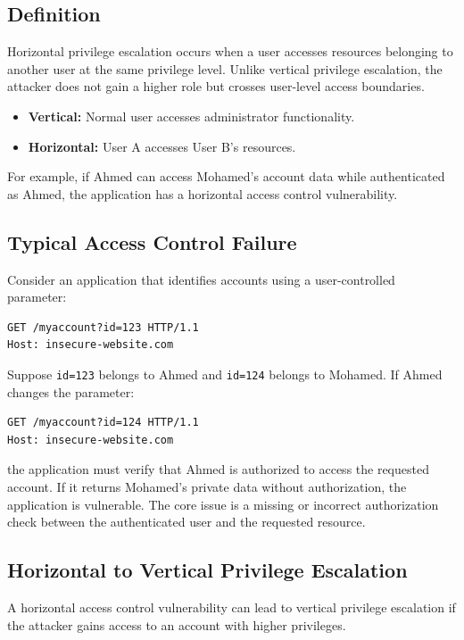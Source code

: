 \documentclass[11pt,a4paper]{article}
\begin{document}
\subsection{Definition}

Horizontal privilege escalation occurs when a user accesses resources belonging to another user at the same privilege level. Unlike vertical privilege escalation, the attacker does not gain a higher role but crosses user-level access boundaries.

\begin{itemize}
    \item \textbf{Vertical:} Normal user accesses administrator functionality.
    \item \textbf{Horizontal:} User A accesses User B's resources.
\end{itemize}

For example, if Ahmed can access Mohamed's account data while authenticated as Ahmed, the application has a horizontal access control vulnerability.

\subsection{Typical Access Control Failure}

Consider an application that identifies accounts using a user-controlled parameter:
\begin{lstlisting}[language=HTTP]
GET /myaccount?id=123 HTTP/1.1
Host: insecure-website.com
\end{lstlisting}

Suppose \texttt{id=123} belongs to Ahmed and \texttt{id=124} belongs to Mohamed. If Ahmed changes the parameter:
\begin{lstlisting}[language=HTTP]
GET /myaccount?id=124 HTTP/1.1
Host: insecure-website.com
\end{lstlisting}

the application must verify that Ahmed is authorized to access the requested account. If it returns Mohamed's private data without authorization, the application is vulnerable.
The core issue is a missing or incorrect authorization check between the authenticated user and the requested resource.

\subsection{Horizontal to Vertical Privilege Escalation}

A horizontal access control vulnerability can lead to vertical privilege escalation if the attacker gains access to an account with higher privileges.
\end{document}
